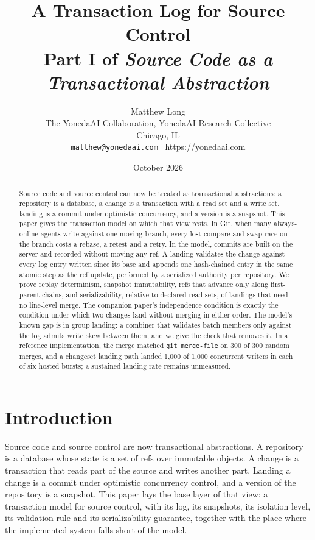 \documentclass[11pt,letterpaper]{article}
\title{A Transaction Log for Source Control\\[4pt]
  {\normalsize Part I of \emph{Source Code as a Transactional Abstraction}}}
\author{Matthew Long\\
  \small The YonedaAI Collaboration, YonedaAI Research Collective\\
  \small Chicago, IL\\
  \small \texttt{matthew@yonedaai.com} \textperiodcentered\ \url{https://yonedaai.com}}
\date{October 2026}
\theoremstyle{definition}
\theoremstyle{remark}
\begin{document}
\maketitle

\begin{abstract}
Source code and source control can now be treated as transactional abstractions: a repository is a database, a change is a transaction with a read set and a write set, landing is a commit under optimistic concurrency, and a version is a snapshot. This paper gives the transaction model on which that view rests. In Git, when many always-online agents write against one moving branch, every lost compare-and-swap race on the branch costs a rebase, a retest and a retry. In the model, commits are built on the server and recorded without moving any ref. A landing validates the change against every log entry written since its base and appends one hash-chained entry in the same atomic step as the ref update, performed by a serialized authority per repository. We prove replay determinism, snapshot immutability, refs that advance only along first-parent chains, and serializability, relative to declared read sets, of landings that need no line-level merge. The companion paper's independence condition is exactly the condition under which two changes land without merging in either order. The model's known gap is in group landing: a combiner that validates batch members only against the log admits write skew between them, and we give the check that removes it. In a reference implementation, the merge matched \texttt{git merge-file} on 300 of 300 random merges, and a changeset landing path landed 1,000 of 1,000 concurrent writers in each of six hosted bursts; a sustained landing rate remains unmeasured. %
\end{abstract}

\section{Introduction}
\label{sec:tlsc:intro}

Source code and source control are now transactional abstractions. A repository is a database whose state is a set of refs over immutable objects. A change is a transaction that reads part of the source and writes another part. Landing a change is a commit under optimistic concurrency control, and a version of the repository is a snapshot. This paper lays the base layer of that view: a transaction model for source control, with its log, its snapshots, its isolation level, its validation rule and its serializability guarantee, together with the place where the implemented system falls short of the model.
\end{document}
